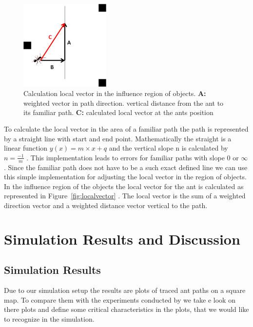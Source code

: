 \documentclass[11pt]{article}
\begin{document}
	\begin{figure}[H]
		\centering
		\includegraphics[width=0.4\textwidth]{localvector.png}
		\caption{Calculation local vector in the influence region of objects. \textbf{A:} weighted vector in path direction.  	vertical distance from the ant to its familiar path. \textbf{C:} calculated local vector at the ants position} 
		\label{fig:localvector}
	\end{figure}
To calculate the local vector in the area of a familiar path the path is represented by a straight line with start and end point. Mathematically the straight is a linear function \( y(x)= m\times x + q \) and the vertical slope n is calculated by \( n = \frac {-1} {m}\) . This implementation leads to errors for familiar paths with slope 0 or \(\infty\). Since the familiar path does not have to be a such exact defined line we can use this simple implementation for adjusting the local vector in the region of objects. In the influence region of the objects the local vector for the ant is calculated as represented in Figure~\vref{fig:localvector} . The local vector is the sum of a weighted direction vector and a weighted distance vector vertical to the path. 





\section{Simulation Results and Discussion}
	\subsection{Simulation Results} %
		Due to our simulation setup the results are plots of traced ant paths on a square map. To compare them with the experiments conducted by \cite{wehner} we take e look on there plots and define some critical characteristics in the plots, that we would like to recognize in the simulation.
\end{document}
